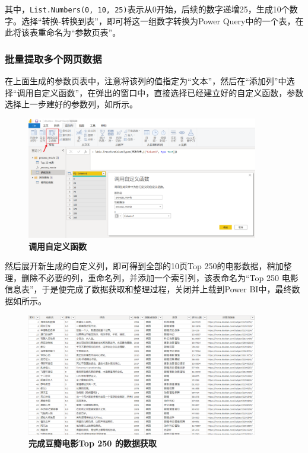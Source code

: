 其中，\verb|List.Numbers(0, 10, 25)|表示从0开始，后续的数字递增25，生成10个数字。选择``转换-转换到表''，即可将这一组数字转换为Power Query中的一个表，在此将该表重命名为``参数页表''。

\subsubsection{批量提取多个网页数据}

在上面生成的参数页表中，注意将该列的值指定为``文本''，然后在``添加列''中选择``调用自定义函数''，在弹出的窗口中，直接选择已经建立好的自定义函数，参数选择上一步建好的参数列，如所示。

\begin{figure}[htbp]
    \centering
    \includegraphics[width=0.9\textwidth]{figure/PowerBI/douban_call_param.png}
    \caption{\textbf{调用自定义函数}}
    \label{fig:douban_call_param}
\end{figure}

然后展开新生成的自定义列，即可得到全部的10页Top 250的电影数据，稍加整理，删除不必要的列，重命名列，并添加一个索引列，该表命名为``Top 250 电影信息表''，于是便完成了数据获取和整理过程，关闭并上载到Power BI中，最终数据如所示。

\begin{figure}[htbp]
    \centering
    \includegraphics[width=0.9\textwidth]{figure/PowerBI/douban_top250_fetched.png}
    \caption{\textbf{完成豆瓣电影Top 250 的数据获取}}
    \label{fig:douban_top250_fetched}
\end{figure}

